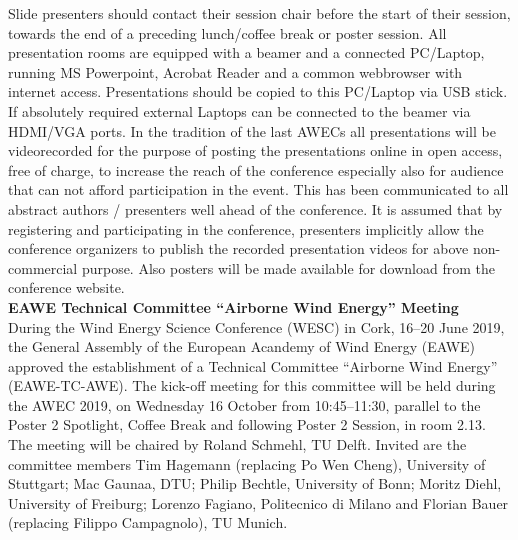 Slide presenters should contact their session chair before the start of their session, towards the end of a preceding lunch/coffee break or poster session. All presentation rooms are equipped with a beamer and a connected PC/Laptop, running MS Powerpoint, Acrobat Reader and a common webbrowser with internet access. Presentations should be copied to this PC/Laptop via USB stick. If absolutely required external Laptops can be connected to the beamer via HDMI/VGA ports. In the tradition of the last AWECs all presentations will be videorecorded for the purpose of posting the presentations online in open access, free of charge, to increase the reach of the conference especially also for audience that can not afford participation in the event. This has been communicated to all abstract authors / presenters well ahead of the conference. It is assumed that by registering and participating in the conference, presenters implicitly allow the conference organizers to publish the recorded presentation videos for above non-commercial purpose. Also posters will be made available for download from the conference website.\\[.2cm]

\textbf{\Large EAWE Technical Committee ``Airborne Wind Energy'' Meeting}\\

During the Wind Energy Science Conference (WESC) in Cork, 16--20 June 2019, the General Assembly of the European Acandemy of Wind Energy (EAWE) approved the establishment of a Technical Committee ``Airborne Wind Energy'' (EAWE-TC-AWE). The kick-off meeting for this committee will be held during the AWEC 2019, on Wednesday 16 October from 10:45--11:30, parallel to the Poster 2 Spotlight, Coffee Break and following Poster 2 Session, in room 2.13. The meeting will be chaired by Roland Schmehl, TU Delft. Invited are the committee members Tim Hagemann (replacing Po Wen Cheng), University of Stuttgart; Mac Gaunaa, DTU; Philip Bechtle, University of Bonn; Moritz Diehl, University of Freiburg; Lorenzo Fagiano, Politecnico di Milano and Florian Bauer (replacing Filippo Campagnolo), TU Munich.\\[.2cm]
